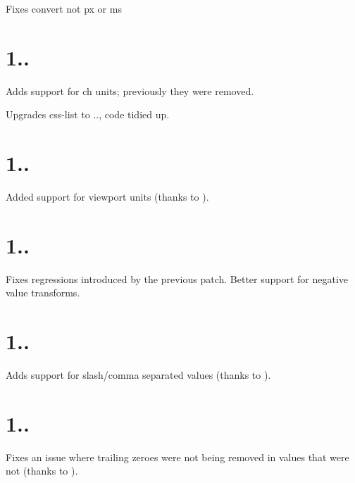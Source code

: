 \begin{DoxyItemize}
\item Fixes convert not px or ms
\end{DoxyItemize}

\section*{1..}


\begin{DoxyItemize}
\item Adds support for {\ttfamily ch} units; previously they were removed.
\item Upgrades css-\/list to {..}, code tidied up.
\end{DoxyItemize}

\section*{1..}


\begin{DoxyItemize}
\item Added support for viewport units (thanks to ).
\end{DoxyItemize}

\section*{1..}


\begin{DoxyItemize}
\item Fixes regressions introduced by the previous patch. Better support for negative value transforms.
\end{DoxyItemize}

\section*{1..}


\begin{DoxyItemize}
\item Adds support for slash/comma separated values (thanks to ).
\end{DoxyItemize}

\section*{1..}


\begin{DoxyItemize}
\item Fixes an issue where trailing zeroes were not being removed in values that were not {} (thanks to ).
\end{DoxyItemize}

